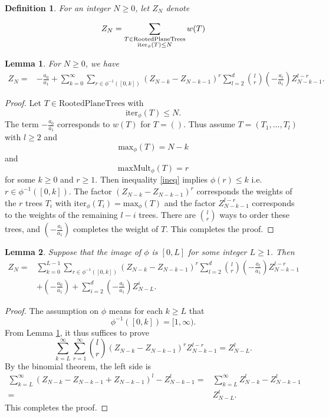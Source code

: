 \documentclass[11pt, oneside]{article}   	%
\newtheorem{lemma}{Lemma}
\newtheorem{definition}{Definition}
\newcommand{\iter}{\mathrm{iter}_\phi}
\newcommand{\maxphi}{\mathrm{max}_\phi}
\newcommand{\maxMult}{\mathrm{maxMult}_\phi}
\begin{document}
\begin{definition} 
For an integer $N \geq 0$, let $Z_N$ denote 

\[
Z_N = \sum_{\substack{ T \in \mathrm{RootedPlaneTrees} \\ \iter(T) \leq N }} w(T) \\ 
\]

\end{definition}

\begin{lemma} \label{l krsum}
For $N\geq 0$, we have
\begin{align}
Z_N = & -\frac{a_0}{a_1}+\sum_{k=0}^{\infty} \sum_{r \in \phi^{-1}([0,k])} (Z_{N-k}-Z_{N-k-1})^r \sum_{l=2}^d { l \choose r} (-\frac{a_l}{a_1})Z_{N-k-1}^{l-r}. 
         \end{align}
\end{lemma}

\begin{proof}
Let $T \in \mathrm{RootedPlaneTrees}$ with 
\begin{equation} \label{ineq}
\iter(T) \leq N.
\end{equation}
 The term $ -\frac{a_0}{a_1}$ corresponds to $w(T)$ for $T=()$. Thus assume $T = (T_1, \ldots, T_l)$ with $l \geq 2$ and \[\maxphi(T)=N-k\] and \[\maxMult(T) = r\] for some $k \geq 0$ and $r \geq 1$. Then inequality \eqref{ineq} implies $\phi(r) \leq k$ i.e. $r \in \phi^{-1}([0,k])$. The factor $(Z_{N-k}-Z_{N-k-1})^r$ corresponds the weights of the $r$ trees $T_i$ with $\iter(T_i) = \maxphi(T)$ and the factor $Z_{N-k-1}^{l-r}$ corresponds to the weights of the remaining $l-i$ trees. There are ${ l \choose r}$ ways to order these trees, and $(-\frac{a_l}{a_1})$ completes the weight of $T$. This completes the proof. 
 \end{proof}

\begin{lemma} \label{l krsum L}
Suppose that the image of $\phi$ is $[0,L]$ for some integer $L \geq 1$. Then
\begin{align}
Z_N = &\sum_{k=0}^{L-1} \sum_{r \in \phi^{-1}([0,k])} (Z_{N-k}-Z_{N-k-1})^r \sum_{l=2}^d { l \choose r} (-\frac{a_l}{a_1})Z_{N-k-1}^{l-r}  \label{krsum L sum}\\
         & + (-\frac{a_0}{a_1})+\sum_{i=2}^d  (-\frac{a_i}{a_1}) Z_{N-L}^i. \label{krsum L f}
\end{align}
\end{lemma}
\begin{proof}
The assumption on $\phi$ means for each $k \geq L$ that
\[
\phi^{-1}([0,k]) =  [1,\infty).
\]
From Lemma \ref{l krsum}, it thus suffices to prove  
\[
\sum_{k=L}^{\infty} \sum_{r =1}^\infty { l \choose r} (Z_{N-k}-Z_{N-k-1})^r  Z_{N-k-1}^{l-r} =   Z_{N-L}^l.
\]
By the binomial theorem, the left side is 
\begin{align*}
\sum_{k=L}^{\infty} (Z_{N-k}-Z_{N-k-1}+ Z_{N-k-1})^l  -   Z_{N-k-1}^l   = &\sum_{k=L}^{\infty} Z_{N-k}^l  -   Z_{N-k-1}^l \\ 
=& Z_{N-L}^l.
\end{align*}
 This completes the proof. 
\end{proof}
\end{document}
